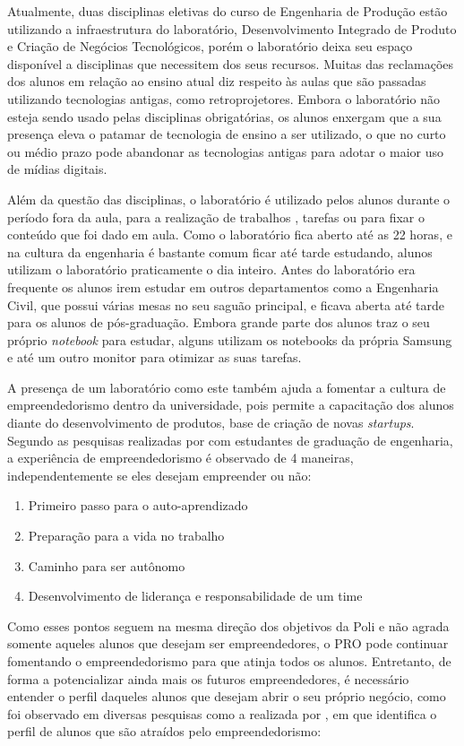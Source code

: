 Atualmente, duas disciplinas eletivas do curso de Engenharia de Produção estão utilizando a infraestrutura do laboratório, Desenvolvimento Integrado de Produto e Criação de Negócios Tecnológicos, porém o laboratório deixa seu espaço disponível a disciplinas que necessitem dos seus recursos. Muitas das reclamações dos alunos em relação ao ensino atual diz respeito às aulas que são passadas utilizando tecnologias antigas, como retroprojetores. Embora o laboratório não esteja sendo usado pelas disciplinas obrigatórias, os alunos enxergam que a sua presença eleva o patamar de tecnologia de ensino a ser utilizado, o que no curto ou médio prazo pode abandonar as tecnologias antigas para adotar o maior uso de mídias digitais.

Além da questão das disciplinas, o laboratório é utilizado pelos alunos durante o período fora da aula, para a realização de trabalhos , tarefas ou para fixar o conteúdo que foi dado em aula. Como o laboratório fica aberto até as 22 horas, e na cultura da engenharia é bastante comum ficar até tarde estudando, alunos utilizam o laboratório praticamente o dia inteiro. Antes do laboratório era frequente os alunos irem estudar em outros departamentos como a Engenharia Civil, que possui várias mesas no seu saguão principal, e ficava aberta até tarde para os alunos de pós-graduação. Embora grande parte dos alunos traz o seu próprio \textit{notebook} para estudar, alguns utilizam os notebooks da própria Samsung e até um outro monitor para otimizar as suas tarefas.

A presença de um laboratório como este também ajuda a fomentar a cultura de empreendedorismo dentro da universidade, pois permite a capacitação dos alunos diante do desenvolvimento de produtos, base de criação de novas \textit{startups}. Segundo as pesquisas realizadas por  com estudantes de graduação de engenharia, a experiência de empreendedorismo é observado de 4 maneiras, independentemente se eles desejam empreender ou não: 

\begin{enumerate}
\item Primeiro passo para o auto-aprendizado
\item Preparação para a vida no trabalho
\item Caminho para ser autônomo
\item Desenvolvimento de liderança e responsabilidade de um time
\end{enumerate}

Como esses pontos seguem na mesma direção dos objetivos da Poli e não agrada somente aqueles alunos que desejam ser empreendedores, o PRO pode continuar fomentando o empreendedorismo para que atinja todos os alunos. Entretanto, de forma a potencializar ainda mais os futuros empreendedores, é necessário entender o perfil daqueles alunos que desejam abrir o seu próprio negócio, como foi observado em diversas pesquisas como a realizada por , em que identifica o perfil de alunos que são atraídos pelo empreendedorismo:

